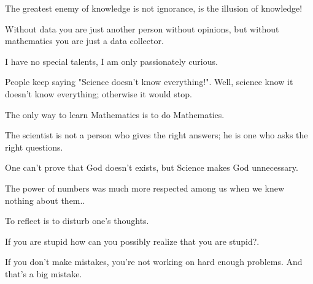  	 \begin{fuquote}The greatest enemy of knowledge is not ignorance, is the illusion of knowledge!
 	\end{fuquote}
 	
 	 \begin{fuquote}[?]Without data you are just another person without opinions, but without mathematics you are just a data collector.
 	\end{fuquote}
 	
 	\begin{fuquote}I have no special talents, I am only passionately curious.
 	\end{fuquote}

	\begin{fuquote}People keep saying "Science doesn't know everything!". Well, science know it doesn't know everything; otherwise it would stop.
 	\end{fuquote}
 	
 	\begin{fuquote}The only way to learn Mathematics is to do Mathematics.
 	\end{fuquote}

	\begin{fuquote}The scientist is not a person who gives the right answers; he is one who asks the right questions.
 	\end{fuquote}
 	
	\begin{fuquote}One can't prove that God doesn't exists, but Science makes God unnecessary.
 	\end{fuquote}

 	 \begin{fuquote}[Voltaire]The power of numbers was much more respected among us when we knew nothing about them..
 	\end{fuquote}

	\begin{fuquote}To reflect is to disturb one's thoughts.
 	\end{fuquote} 
 	
 	\begin{fuquote}If you are stupid how can you possibly realize that you are stupid?.
 	\end{fuquote} 	
 	
 	\begin{fuquote}If you don't make mistakes, you're not working on hard enough problems. And that's a big mistake.
 	\end{fuquote}

